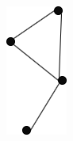 \begin{figure}
\begin{subfigure}{0.08\textwidth}
\includegraphics[width=\linewidth]{images/manet_trust_1.png}
\caption{} \label{fig:2_3b}
\end{subfigure}


\end{figure}
